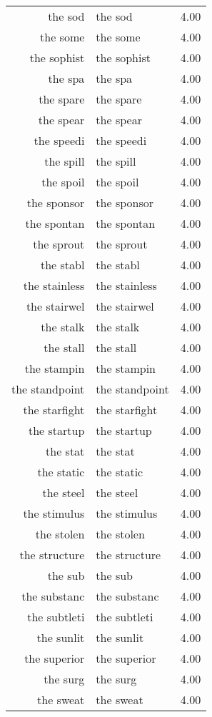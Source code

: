 \begin{table}[ht]
\begin{tabular}{rlr}
  the sod & the sod & 4.00 \\ 
  the some & the some & 4.00 \\ 
  the sophist & the sophist & 4.00 \\ 
  the spa & the spa & 4.00 \\ 
  the spare & the spare & 4.00 \\ 
  the spear & the spear & 4.00 \\ 
  the speedi & the speedi & 4.00 \\ 
  the spill & the spill & 4.00 \\ 
  the spoil & the spoil & 4.00 \\ 
  the sponsor & the sponsor & 4.00 \\ 
  the spontan & the spontan & 4.00 \\ 
  the sprout & the sprout & 4.00 \\ 
  the stabl & the stabl & 4.00 \\ 
  the stainless & the stainless & 4.00 \\ 
  the stairwel & the stairwel & 4.00 \\ 
  the stalk & the stalk & 4.00 \\ 
  the stall & the stall & 4.00 \\ 
  the stampin & the stampin & 4.00 \\ 
  the standpoint & the standpoint & 4.00 \\ 
  the starfight & the starfight & 4.00 \\ 
  the startup & the startup & 4.00 \\ 
  the stat & the stat & 4.00 \\ 
  the static & the static & 4.00 \\ 
  the steel & the steel & 4.00 \\ 
  the stimulus & the stimulus & 4.00 \\ 
  the stolen & the stolen & 4.00 \\ 
  the structure & the structure & 4.00 \\ 
  the sub & the sub & 4.00 \\ 
  the substanc & the substanc & 4.00 \\ 
  the subtleti & the subtleti & 4.00 \\ 
  the sunlit & the sunlit & 4.00 \\ 
  the superior & the superior & 4.00 \\ 
  the surg & the surg & 4.00 \\ 
  the sweat & the sweat & 4.00 \\ 

\end{tabular}
\end{table}
